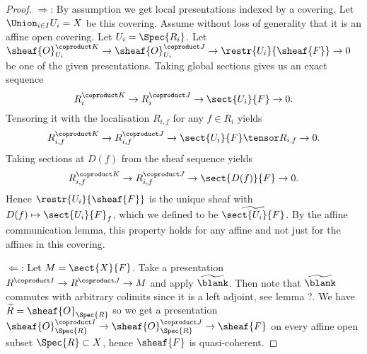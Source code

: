 
\begin{proof}
$\Rightarrow$:
By assumption we get local presentations indexed by a covering.
Let $\Union_{i\in I} U_i = X$ be this covering.
Assume without loss of generality that it is an affine open covering.
Let $U_i = \Spec{R_i}$.
Let $\sheaf{O}_{U_i}^{\coproduct K} \rightarrow \sheaf{O}_{U_i}^{\coproduct J} \rightarrow \restr{U_i}{\sheaf{F}} \rightarrow 0$
be one of the given presentations.
Taking global sections gives us an exact sequence
\[R_i^{\coproduct K} \rightarrow R_i^{\coproduct J} \rightarrow \sect{U_i}{F} \rightarrow 0.\]
Tensoring it with the localisation $R_{i,f}$ for any $f\in R_i$ yields
\[R_{i,f}^{\coproduct K} \rightarrow R_{i,f}^{\coproduct J} \rightarrow \sect{U_i}{F}\tensor R_{i,f} \rightarrow 0.\]
Taking sections at $D(f)$ from the sheaf sequence yields
\[R_{i,f}^{\coproduct K} \rightarrow R_{i,f}^{\coproduct J} \rightarrow \sect{D(f)}{F} \rightarrow 0.\]
Hence $\restr{U_i}{\sheaf{F}}$ is the unique sheaf with 
$D(f) \mapsto \sect{U_i}{F}_f$,
which we defined to be $\widetilde{\sect{U_i}{F}}$.
By the affine communication lemma, 
this property holds for any affine and not just for the affines in this covering.

$\Leftarrow$:
Let $M = \sect{X}{F}$.
Take a presentation $R^{\coproduct I} \rightarrow R^{\coproduct J} \rightarrow M$
and apply $\widetilde{\blank}$. 
Then note that $\widetilde{\blank}$ commutes with arbitrary colimits
since it is a left adjoint, see lemma ?.
We have $\widetilde{R} = \sheaf{O}_{\Spec{R}}$
so we get a presentation 
$\sheaf{O}_{\Spec{R}}^{\coproduct I} \rightarrow \sheaf{O}_{\Spec{R}}^{\coproduct J} \rightarrow \sheaf{F}$ 
on every affine open subset $\Spec{R}\subset X$, hence $\sheaf{F}$ is quasi-coherent.
\end{proof}
